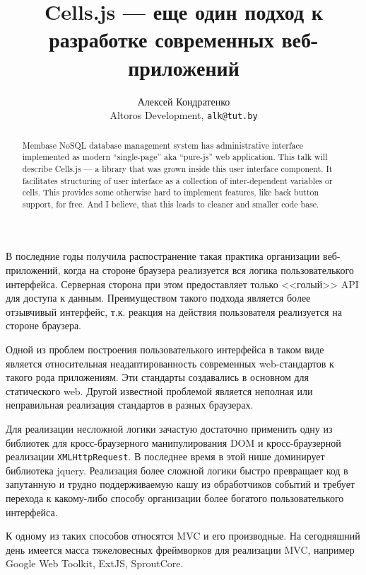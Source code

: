 \documentclass[10pt, a5paper]{article}
\begin{document}
\title{Cells.js --- еще один подход к разработке современных веб-приложений}

\author{Алексей Кондратенко\\
\small Altoros Development, \texttt{alk@tut.by}
}
\maketitle

\begin{abstract}
Membase NoSQL database management system has administrative interface 
implemented as modern ``single-page'' aka ``pure-js'' web application. 
This talk will describe Cells.js --- a library that was grown inside 
this user interface component. It facilitates structuring of user 
interface as a collection of inter-dependent variables or cells. This 
provides some otherwise hard to implement features, like back button 
support, for free. And I believe, that this leads to cleaner and smaller 
code base.
\end{abstract}

В последние годы получила распостранение такая практика организации
веб-приложений, когда на стороне браузера реализуется вся логика
пользователького интерфейса. Серверная сторона при этом предоставляет
только <<голый>> API для доступа к данным. Преимуществом такого подхода
является более отзывчивый интерфейс, т.к. реакция на действия
пользователя реализуется на стороне браузера.

Одной из проблем построения пользователького интерфейса в таком виде
является относительная неадаптированность современных web-стандартов
к такого рода приложениям. Эти стандарты создавались в основном для
статического web. Другой известной проблемой является неполная или
неправильная реализация стандартов в разных браузерах.

Для реализации несложной логики зачастую достаточно применить одну из
библиотек для кросс-браузерного манипулирования DOM и кросс-браузерной
реализации \verb!XMLHttpRequest!. В последнее время в этой нише доминирует
библиотека jquery. Реализация более сложной логики быстро превращает
код в запутанную и трудно поддерживаемую кашу из обработчиков событий и 
требует перехода к какому-либо способу организации более богатого
пользователького интерфейса.

К одному из таких способов относятся MVC и его производные. На
сегодняшний день имеется масса тяжеловесных фреймворков для
реализации MVC, например Google Web Toolkit, ExtJS, SproutCore.
\end{document}
